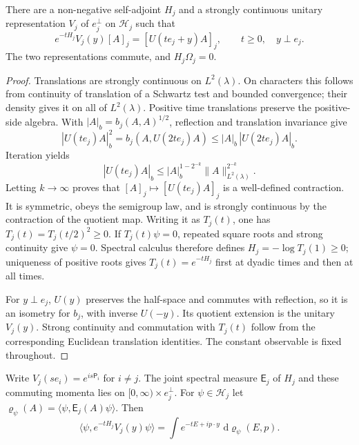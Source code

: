 \documentclass[11pt,letterpaper,reqno]{amsart}
\newcommand{\dd}{\,\mathrm d}
\begin{document}
\begin{proposition}\label{prop:axis-reconstruction}
There are a non-negative self-adjoint $H_j$ and a strongly continuous
unitary representation $V_j$ of $e_j^\perp$ on $\mathcal H_j$ such
that
\begin{equation}\label{eq:axis-semigroup}
 e^{-tH_j}V_j(y)[A]_j=[U(te_j+y)A]_j,
 \qquad t\ge0,\quad y\perp e_j.
\end{equation}
The two representations commute, and $H_j\Omega_j=0$.
\end{proposition}

\begin{proof}
Translations are strongly continuous on $L^2(\lambda)$. On
characters this follows from continuity of translation of a Schwartz
test and bounded convergence; their density gives it on all of
$L^2(\lambda)$. Positive time translations preserve the positive-side
algebra. With $|A|_b=b_j(A,A)^{1/2}$, reflection and translation
invariance give
\[
 |U(te_j)A|_b^2=b_j(A,U(2te_j)A)
 \le |A|_b\,|U(2te_j)A|_b.
\]
Iteration yields
\[
 |U(te_j)A|_b
 \le |A|_b^{1-2^{-k}}\|A\|_{L^2(\lambda)}^{2^{-k}}.
\]
Letting $k\to\infty$ proves that $[A]_j\mapsto[U(te_j)A]_j$
is a well-defined contraction. It is symmetric, obeys the semigroup
law, and is strongly continuous by the contraction of the quotient
map. Writing it as $T_j(t)$, one has
$T_j(t)=T_j(t/2)^2\ge0$. If $T_j(t)\psi=0$, repeated square roots
and strong continuity give $\psi=0$. Spectral calculus therefore
defines $H_j=-\log T_j(1)\ge0$; uniqueness of positive roots gives
$T_j(t)=e^{-tH_j}$ first at dyadic times and then at all times.

For $y\perp e_j$, $U(y)$ preserves the half-space and commutes with
reflection, so it is an isometry for $b_j$, with inverse $U(-y)$.
Its quotient extension is the unitary $V_j(y)$. Strong continuity
and commutation with $T_j(t)$ follow from the corresponding Euclidean
translation identities. The constant observable is fixed throughout.
\end{proof}

Write $V_j(se_i)=e^{is\mathsf P_i}$ for $i\ne j$. The joint spectral
measure $\mathsf E_j$ of $H_j$ and these commuting momenta lies on
$[0,\infty)\times e_j^\perp$. For $\psi\in\mathcal H_j$ let
$\varrho_\psi(A)=\langle\psi,\mathsf E_j(A)\psi\rangle$.
Then
\begin{equation}\label{eq:joint-spectral-integral}
 \langle\psi,e^{-tH_j}V_j(y)\psi\rangle
 =\int e^{-tE+ip\cdot y}\,\dd\varrho_\psi(E,p).
\end{equation}
\end{document}

